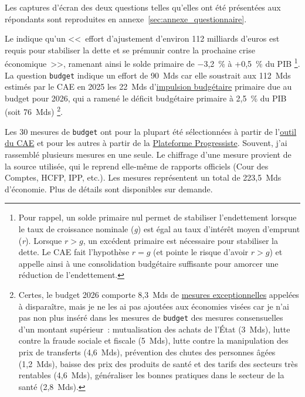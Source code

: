 \documentclass[12pt,french]{article}
\begin{document}
Les captures d'écran des deux questions telles qu'elles ont été présentées aux répondants sont reproduites en annexe~\ref{sec:annexe_questionnaire}.

Le \cite{CAE2025} indique qu'un <<~effort d'ajustement d'environ 112 milliards d'euros est requis pour stabiliser la dette et se prémunir contre la prochaine crise économique~>>, ramenant ainsi le solde primaire de $-$3,2~\% à +0,5~\% du PIB%
\footnote{Pour rappel, un solde primaire nul permet de stabiliser l'endettement lorsque le taux de croissance nominale (\textit{g}) est égal au taux d'intérêt moyen d'emprunt (\textit{r}). Lorsque $r>g$, un excédent primaire est nécessaire pour stabiliser la dette. Le CAE fait l'hypothèse $r=g$ (et pointe le risque d'avoir $r>g$) et appelle ainsi à une consolidation budgétaire suffisante pour amorcer une réduction de l'endettement.}. 
La question \texttt{budget} indique un effort de 90~Mds car elle soustrait aux 112~Mds estimés par le CAE en 2025 les 22~Mds d'\href{https://www.ofce.sciences-po.fr/blog2024/fr/2026/20260228_MPPIMRS/}{impulsion budgétaire} primaire due au budget pour 2026, qui a ramené le déficit budgétaire primaire à 2,5~\% du PIB (soit 76~Mds)%
\footnote{Certes, le budget 2026 comporte 8,3~Mds de \href{https://www.ofce.sciences-po.fr/blog2024/fr/2026/20260228_MPPIMRS/}{mesures exceptionnelles} appelées à disparaître, mais je ne les ai pas ajoutées aux économies visées car je n'ai pas non plus inséré dans les mesures de \texttt{budget} des mesures consensuelles d'un montant supérieur~: mutualisation des achats de l'État (3~Mds), lutte contre la fraude sociale et fiscale (5~Mds), lutte contre la manipulation des prix de transferts (4,6~Mds), prévention des chutes des personnes âgées (1,2~Mds), baisse des prix des produits de santé et des tarifs des secteurs très rentables (4,6~Mds), généraliser les bonnes pratiques dans le secteur de la santé (2,8~Mds).}.

Les 30 mesures de \texttt{budget} ont pour la plupart été sélectionnées à partir de l'\href{https://claude.ai/public/artifacts/74cd0701-a4f0-499e-a409-cae1da524ee4}{outil du CAE} et pour les autres à partir de la \href{https://laplateformeprogressiste.org/wp-content/uploads/2025/12/20251210_Resultats-par-mesure-1.pdf}{Plateforme Progressiste}. Souvent, j'ai rassemblé plusieurs mesures en une seule. Le chiffrage d'une mesure provient de la source utilisée, qui le reprend elle-même de rapports officiels (Cour des Comptes, HCFP, IPP, etc.). Les mesures représentent un total de 223,5~Mds d'économie. Plus de détails sont disponibles sur demande.
\end{document}
